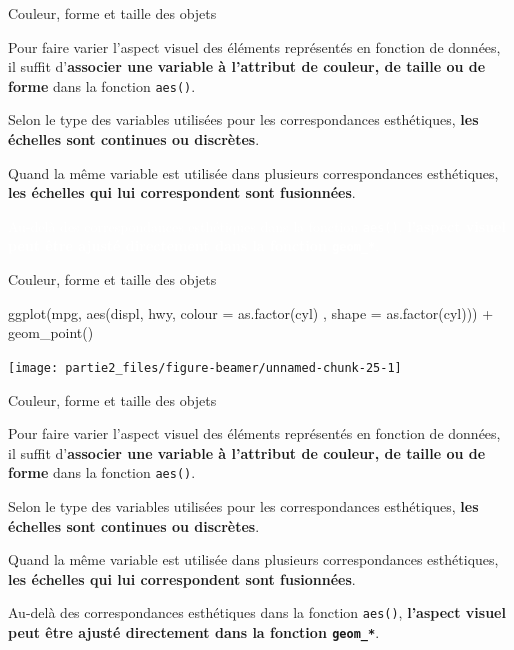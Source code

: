 \documentclass[12pt,ignorenonframetext,]{beamer}
\newenvironment{Shaded}{}{}
\newcommand{\KeywordTok}[1]{\textcolor[rgb]{0.00,0.00,1.00}{#1}}
\newcommand{\DataTypeTok}[1]{#1}
\newcommand{\StringTok}[1]{\textcolor[rgb]{0.00,0.50,0.50}{#1}}
\newcommand{\OperatorTok}[1]{#1}
\newcommand{\NormalTok}[1]{#1}
\renewenvironment{Shaded}{\begin{snugshade}}{\end{snugshade}}
\begin{document}
\begin{frame}{Couleur, forme et taille des objets}

Pour faire varier l'aspect visuel des éléments représentés en fonction
de données, il suffit
d'\textbf{associer une variable à l'attribut de couleur, de taille ou de forme}
dans la fonction \texttt{aes()}.

Selon le type des variables utilisées pour les correspondances
esthétiques, \textbf{les échelles sont continues ou discrètes}.

Quand la même variable est utilisée dans plusieurs correspondances
esthétiques,
\textbf{les échelles qui lui correspondent sont fusionnées}.

\textcolor{white}{Au-delà des correspondances esthétiques dans la fonction \texttt{aes()}, \textbf{l'aspect visuel peut être ajusté directement dans la fonction \texttt{geom\_*}}.}

\end{frame}

\begin{frame}[fragile]{Couleur, forme et taille des objets}

\footnotesize \center

\begin{Shaded}
\begin{Highlighting}[]
\KeywordTok{ggplot}\NormalTok{(mpg, }\KeywordTok{aes}\NormalTok{(displ, hwy, }\DataTypeTok{colour =} \KeywordTok{as.factor}\NormalTok{(cyl)}
\NormalTok{  , }\DataTypeTok{shape =} \KeywordTok{as.factor}\NormalTok{(cyl))) }\OperatorTok{+}
\StringTok{  }\KeywordTok{geom_point}\NormalTok{()}
\end{Highlighting}
\end{Shaded}

\texttt{[image: partie2\_files/figure-beamer/unnamed-chunk-25-1]}

\end{frame}

\begin{frame}{Couleur, forme et taille des objets}

Pour faire varier l'aspect visuel des éléments représentés en fonction
de données, il suffit
d'\textbf{associer une variable à l'attribut de couleur, de taille ou de forme}
dans la fonction \texttt{aes()}.

Selon le type des variables utilisées pour les correspondances
esthétiques, \textbf{les échelles sont continues ou discrètes}.

Quand la même variable est utilisée dans plusieurs correspondances
esthétiques,
\textbf{les échelles qui lui correspondent sont fusionnées}.

Au-delà des correspondances esthétiques dans la fonction \texttt{aes()},
\textbf{l'aspect visuel peut être ajusté directement dans la fonction \texttt{geom\_*}}.

\end{frame}
\end{document}
